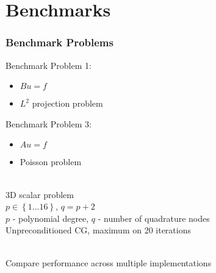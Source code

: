 \documentclass{beamer}
\begin{document}
\section{Benchmarks}

\begin{frame}
\begin{center}
\frametitle{Benchmark Problems}

\begin{multicols}{2}

\begin{flushleft}
Benchmark Problem 1:
\end{flushleft}

\begin{itemize}

\item $B u = f$

\item $L^2$ projection problem

\end{itemize}

\begin{flushleft}
Benchmark Problem 3:
\end{flushleft}

\begin{itemize}

\item $A u = f$

\item Poisson problem

\end{itemize}

\end{multicols}

\begin{flushleft}

~\\

3D scalar problem\\

$p \in \left\{ 1 ... 16 \right\}$, $q = p + 2$\\

$p$ - polynomial degree, $q$ - number of quadrature nodes\\

Unpreconditioned CG, maximum on 20 iterations

~\\

Compare performance across multiple implementations

\end{flushleft}

\end{center}
\end{frame}
\end{document}
